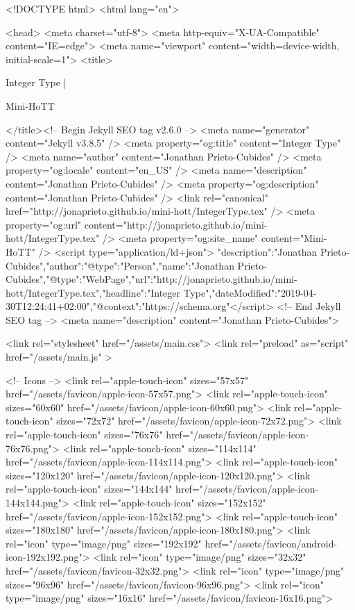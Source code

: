 <!DOCTYPE html>
<html lang="en">

<head>
  <meta charset="utf-8">
  <meta http-equiv="X-UA-Compatible" content="IE=edge">
  <meta name="viewport" content="width=device-width, initial-scale=1">
  <title>
    
      
        Integer Type |
      
        Mini-HoTT
    
  </title><!-- Begin Jekyll SEO tag v2.6.0 -->
<meta name="generator" content="Jekyll v3.8.5" />
<meta property="og:title" content="Integer Type" />
<meta name="author" content="Jonathan Prieto-Cubides" />
<meta property="og:locale" content="en_US" />
<meta name="description" content="Jonathan Prieto-Cubides" />
<meta property="og:description" content="Jonathan Prieto-Cubides" />
<link rel="canonical" href="http://jonaprieto.github.io/mini-hott/IntegerType.tex" />
<meta property="og:url" content="http://jonaprieto.github.io/mini-hott/IntegerType.tex" />
<meta property="og:site_name" content="Mini-HoTT" />
<script type="application/ld+json">
{"description":"Jonathan Prieto-Cubides","author":{"@type":"Person","name":"Jonathan Prieto-Cubides"},"@type":"WebPage","url":"http://jonaprieto.github.io/mini-hott/IntegerType.tex","headline":"Integer Type","dateModified":"2019-04-30T12:24:41+02:00","@context":"https://schema.org"}</script>
<!-- End Jekyll SEO tag -->
<meta name="description" content="Jonathan Prieto-Cubides">

  <link rel="stylesheet" href="/assets/main.css">
  <link rel="preload" as="script" href="/assets/main.js" >

  <!-- Icons -->
  <link rel="apple-touch-icon" sizes="57x57" href="/assets/favicon/apple-icon-57x57.png">
  <link rel="apple-touch-icon" sizes="60x60" href="/assets/favicon/apple-icon-60x60.png">
  <link rel="apple-touch-icon" sizes="72x72" href="/assets/favicon/apple-icon-72x72.png">
  <link rel="apple-touch-icon" sizes="76x76" href="/assets/favicon/apple-icon-76x76.png">
  <link rel="apple-touch-icon" sizes="114x114" href="/assets/favicon/apple-icon-114x114.png">
  <link rel="apple-touch-icon" sizes="120x120" href="/assets/favicon/apple-icon-120x120.png">
  <link rel="apple-touch-icon" sizes="144x144" href="/assets/favicon/apple-icon-144x144.png">
  <link rel="apple-touch-icon" sizes="152x152" href="/assets/favicon/apple-icon-152x152.png">
  <link rel="apple-touch-icon" sizes="180x180" href="/assets/favicon/apple-icon-180x180.png">
  <link rel="icon" type="image/png" sizes="192x192"  href="/assets/favicon/android-icon-192x192.png">
  <link rel="icon" type="image/png" sizes="32x32" href="/assets/favicon/favicon-32x32.png">
  <link rel="icon" type="image/png" sizes="96x96" href="/assets/favicon/favicon-96x96.png">
  <link rel="icon" type="image/png" sizes="16x16" href="/assets/favicon/favicon-16x16.png">

